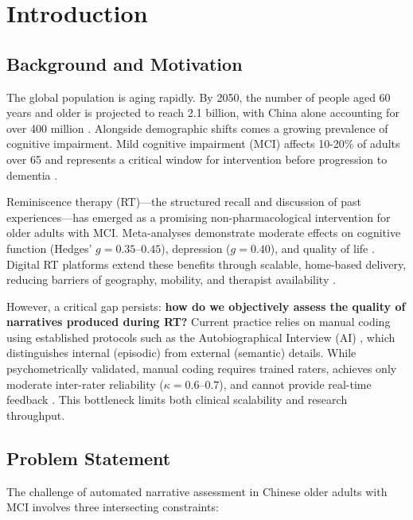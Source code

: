 \documentclass{article}
\begin{document}
\section{Introduction}

\subsection{Background and Motivation}

The global population is aging rapidly. By 2050, the number of people aged 60 years and older is projected to reach 2.1 billion, with China alone accounting for over 400 million \cite{un2024}. Alongside demographic shifts comes a growing prevalence of cognitive impairment. Mild cognitive impairment (MCI) affects 10-20\% of adults over 65 and represents a critical window for intervention before progression to dementia \cite{petersen2016}.

Reminiscence therapy (RT)---the structured recall and discussion of past experiences---has emerged as a promising non-pharmacological intervention for older adults with MCI. Meta-analyses demonstrate moderate effects on cognitive function (Hedges' $g = 0.35$--$0.45$), depression ($g = 0.40$), and quality of life \cite{pu2025, ni2026}. Digital RT platforms extend these benefits through scalable, home-based delivery, reducing barriers of geography, mobility, and therapist availability \cite{wang2026}.

However, a critical gap persists: \textbf{how do we objectively assess the quality of narratives produced during RT?} Current practice relies on manual coding using established protocols such as the Autobiographical Interview (AI) \cite{levine2002}, which distinguishes internal (episodic) from external (semantic) details. While psychometrically validated, manual coding requires trained raters, achieves only moderate inter-rater reliability ($\kappa = 0.6$--$0.7$), and cannot provide real-time feedback \cite{spencer2020}. This bottleneck limits both clinical scalability and research throughput.

\subsection{Problem Statement}

The challenge of automated narrative assessment in Chinese older adults with MCI involves three intersecting constraints:
\end{document}
